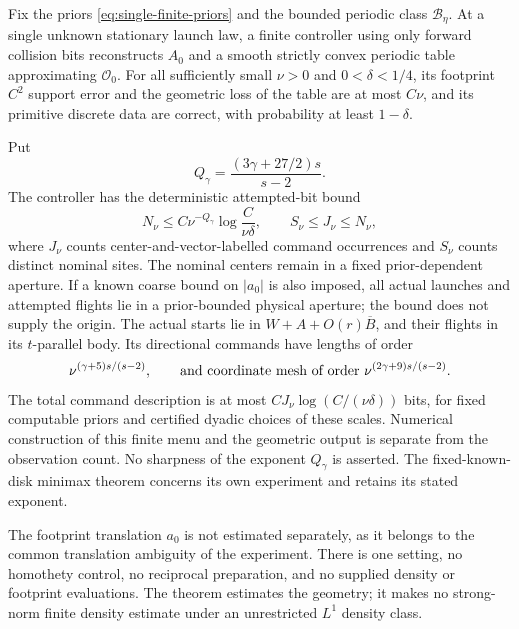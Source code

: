 \begin{theorem}
\label{thm:single-law-finite}
Fix the priors \eqref{eq:single-finite-priors} and the bounded periodic
class $\mathcal B_\eta$.  At a single unknown stationary launch law,
a finite controller using only forward collision bits reconstructs
$A_0$ and a smooth strictly convex periodic table approximating
$\mathcal O_0$.  For all sufficiently small $\nu>0$ and
$0<\delta<1/4$, its footprint $C^2$ support error and the geometric
loss of the table are at most $C\nu$, and its primitive discrete data
are correct, with probability at least $1-\delta$.

Put
\begin{equation}\label{eq:single-finite-exponent}
                 Q_\gamma=\frac{(3\gamma+27/2)s}{s-2}.
\end{equation}
The controller has the deterministic attempted-bit bound
\begin{equation}\label{eq:single-finite-resources}
 N_\nu\le C\nu^{-Q_\gamma}\log\frac{C}{\nu\delta},
             \qquad S_\nu\le J_\nu\le N_\nu,
\end{equation}
where $J_\nu$ counts center-and-vector-labelled command occurrences
and $S_\nu$ counts distinct nominal sites.  The nominal centers remain in a
fixed prior-dependent aperture.  If a known coarse bound on $|a_0|$ is
also imposed, all actual launches and attempted flights lie in a
prior-bounded physical aperture; the bound does not supply the origin.
The actual starts lie in $W+A+O(r)\overline B$, and their flights
in its $t$-parallel body.  Its directional commands have lengths
of order
\begin{equation}\label{eq:single-finite-precision}
 \nu^{(\gamma+5)s/(s-2)},
 \qquad\hbox{and coordinate mesh of order }
             \nu^{(2\gamma+9)s/(s-2)}.
\end{equation}
The total command description is at most
$C J_\nu\log(C/(\nu\delta))$ bits, for fixed computable priors and
certified dyadic choices of these scales.  Numerical construction of
this finite menu and the geometric output is separate from the
observation count.  No sharpness of the exponent $Q_\gamma$ is asserted.
The fixed-known-disk minimax theorem concerns its own experiment and
retains its stated exponent.

The footprint translation $a_0$ is not estimated separately, as it
belongs to the common translation ambiguity of the experiment.  There
is one setting, no homothety control, no reciprocal preparation, and
no supplied density or footprint evaluations.  The theorem estimates
the geometry; it makes no strong-norm finite density estimate under
an unrestricted $L^1$ density class.
\end{theorem}
